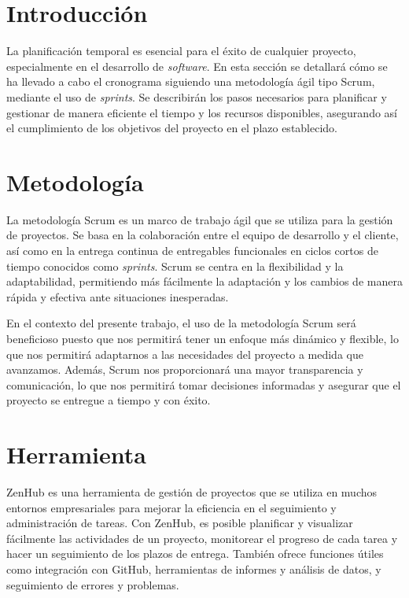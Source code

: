 

\section{Introducción}

La planificación temporal es esencial para el éxito de cualquier proyecto, especialmente en el desarrollo de \textit{software}. En esta sección se detallará cómo se ha llevado a cabo el cronograma siguiendo una metodología ágil tipo Scrum, mediante el uso de \textit{sprints}. Se describirán los pasos necesarios para planificar y gestionar de manera eficiente el tiempo y los recursos disponibles, asegurando así el cumplimiento de los objetivos del proyecto en el plazo establecido.

\section{Metodología}
La metodología Scrum es un marco de trabajo ágil que se utiliza para la gestión de proyectos. Se basa en la colaboración entre el equipo de desarrollo y el cliente, así como en la entrega continua de entregables funcionales en ciclos cortos de tiempo conocidos como \textit{sprints}. Scrum se centra en la flexibilidad y la adaptabilidad, permitiendo más fácilmente la adaptación y los cambios de manera rápida y efectiva ante situaciones inesperadas. 

En el contexto del presente trabajo, el uso de la metodología Scrum será beneficioso puesto que nos permitirá tener un enfoque más dinámico y flexible, lo que nos permitirá adaptarnos a las necesidades del proyecto a medida que avanzamos. Además, Scrum nos proporcionará una mayor transparencia y comunicación, lo que nos permitirá tomar decisiones informadas y asegurar que el proyecto se entregue a tiempo y con éxito.

\section{Herramienta}
ZenHub es una herramienta de gestión de proyectos que se utiliza en muchos entornos empresariales para mejorar la eficiencia en el seguimiento y administración de tareas. Con ZenHub, es posible planificar y visualizar fácilmente las actividades de un proyecto, monitorear el progreso de cada tarea y hacer un seguimiento de los plazos de entrega. También ofrece funciones útiles como integración con GitHub, herramientas de informes y análisis de datos, y seguimiento de errores y problemas.

